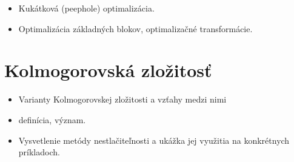 \documentclass[a4paper]{report}
\begin{document}
\begin{zadanie}
\begin{itemize}
 \item Kukátková (peephole) optimalizácia.
 \item Optimalizácia základných blokov, optimalizačné transformácie.
\end{itemize}
\end{zadanie}

\chapter{Kolmogorovská zložitosť}

\begin{zadanie}
\begin{itemize}
 \item Varianty Kolmogorovskej zložitosti a vzťahy medzi nimi
\end{itemize}
\end{zadanie}

\begin{zadanie}
\begin{itemize}
 \item definícia, význam.
 \item Vysvetlenie metódy nestlačiteľnosti a ukážka jej využitia na konkrétnych príkladoch.
\end{itemize}
\end{zadanie}
\end{document}
